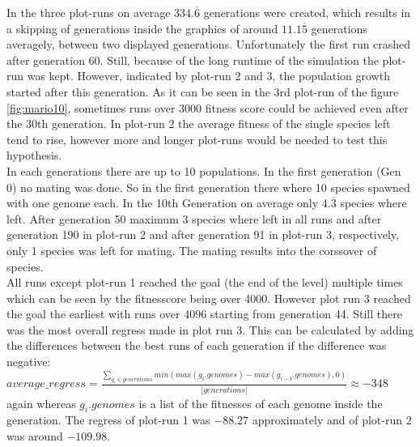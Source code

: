 			In the three plot-runs on average $334.\overline{6}$ generations were created, which results in a skipping of generations inside the graphics of around $11.1\overline{5}$ generations averagely, between two displayed generations. Unfortunately the first run crashed after generation 60. Still, because of the long runtime of the simulation the plot-run was kept. However, indicated by plot-run 2 and 3, the population growth started after this generation. As it can be seen in the 3rd plot-run of the figure \ref{fig:mario10}, sometimes runs over 3000 fitness score could be achieved even after the 30th generation. In plot-run 2 the average fitness of the single species left tend to rise, however more and longer plot-runs would be needed to test this hypothesis.\\
			In each generations there are up to 10 populations. 
			In the first generation (Gen 0) no mating was done. So in the first generation there where 10 species spawned with one genome each. In the 10th Generation on average only $4.\overline{3}$ species where left. After generation 50 maximum 3 species where left in all runs and after generation 190 in plot-run 2 and after generation 91 in plot-run 3, respectively, only 1 species was left for mating. The mating results into the corssover of species.\\
			All runs except plot-run 1 reached the goal (the end of the level) multiple times which can be seen by the fitnesscore being over 4000. However plot run 3 reached the goal the earliest with runs over 4096 starting from generation 44. Still there was the most overall regress made in plot run 3. This can be calculated by adding the differences between the best runs of each generation if the difference was negative: $average\_regress = \frac{\sum\nolimits_{g_i \in generations} min(max(g_i.genomes) - max(g_{i-1}.genomes), 0)}{|generations|}\approx-348$ again whereas $g_i.genomes$ is a list of the fitnesses of each genome inside the generation. The regress of plot-run 1 was $-88.27$ approximately and of plot-run 2 was around $-109.98$.\\
